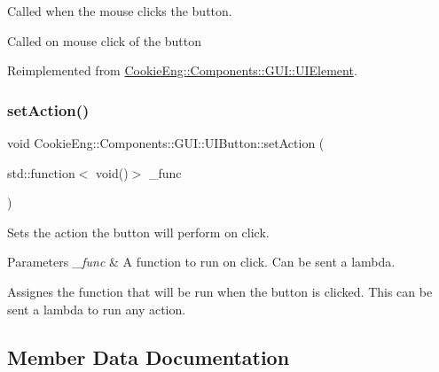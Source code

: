 Called when the mouse clicks the button. 

Called on mouse click of the button 

Reimplemented from \hyperlink{class_cookie_eng_1_1_components_1_1_g_u_i_1_1_u_i_element_a4f36d5a491837291d4e948a84dd13831}{Cookie\+Eng\+::\+Components\+::\+G\+U\+I\+::\+U\+I\+Element}.

\mbox{\label{class_cookie_eng_1_1_components_1_1_g_u_i_1_1_u_i_button_a94a07549ec192e4f0632a540cafc8365}} 
\subsubsection{\texorpdfstring{set\+Action()}{setAction()}}
{\footnotesize\ttfamily void Cookie\+Eng\+::\+Components\+::\+G\+U\+I\+::\+U\+I\+Button\+::set\+Action (\begin{DoxyParamCaption}\item[{std\+::function$<$ void()$>$}]{\+\_\+func }\end{DoxyParamCaption})}



Sets the action the button will perform on click. 


\begin{DoxyParams}{Parameters}
{\em \+\_\+func} & A function to run on click. Can be sent a lambda.\\
\hline
\end{DoxyParams}
Assignes the function that will be run when the button is clicked. This can be sent a lambda to run any action. 

\subsection{Member Data Documentation}
\mbox{\label{class_cookie_eng_1_1_components_1_1_g_u_i_1_1_u_i_button_a3ced1fe752313f5ae05c82e67c621bf4}} 
